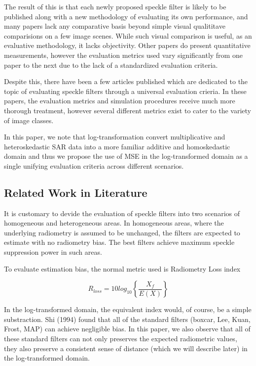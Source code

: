 \documentclass[journal]{IEEEtran}
\begin{document}
The result of this is that each newly proposed speckle filter is likely to be published along with a new methodology of evaluating its own performance, and many papers lack any comparative basis beyond simple visual qualititave comparisions on a few image scenes. While such visual comparison is useful, as an evaluative methodology, it lacks objectivity. Other papers do present quantitative measurements, however the evaluation metrics used vary significantly from one paper to the next due to the lack of a standardized evaluation criteria.

Despite this, there have been a few articles published which are dedicated to the topic of evaluating speckle filters through a universal evaluation crieria. In these papers, the evaluation metrics and simulation procedures receive much more thorough treatment, however several different metrics exist to cater to the variety of image classes.

In this paper, we note that log-transformation convert multiplicative and heteroskedastic SAR data into a more familiar additive and homoskedastic domain and thus we propose the use of MSE in the log-transformed domain as a single unifying evaluation criteria across different scenarios.

\subsection{Related Work in Literature}

It is customary to devide the evaluation of speckle filters into two scenarios of homogeneous and heterogeneous areas.
In homogeneous areas, where the underlying radiometry is assumed to be unchanged, the filters are expected to estimate with no radiometry bias. The best filters achieve maximum speckle suppression power in such areas.

To evaluate estimation bias, the normal metric used is Radiometry Loss index 

\begin{equation}
R_{loss} = 10 log_{10} \left\{\frac{X_f}{E(X)} \right\}
\end{equation}

In the log-transformed domain, the equivalent index would, of course, be a simple substraction.
Shi (1994) found that all of the standard filters (boxcar, Lee, Kuan, Frost, MAP) can achieve negligible bias. In this paper, we also observe that all of these standard filters can not only preserves the expected radiometric values, they also preserve a consistent sense of distance (which we will describe later) in the log-transformed domain.
\end{document}
